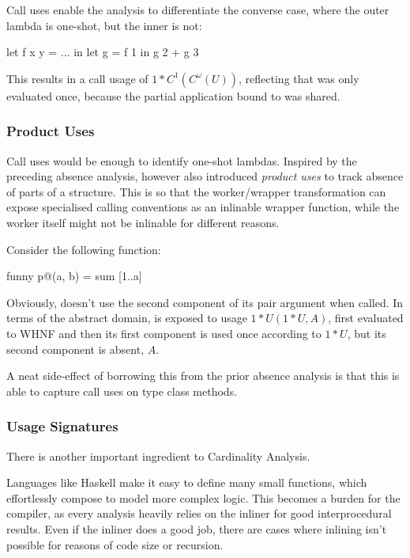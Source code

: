 Call uses enable the analysis to differentiate the converse case, where the outer lambda is one-shot, but the inner is not:
\begin{haskellcode}
  let f x y = ...
  in let g = f 1
     in g 2 + g 3
\end{haskellcode}

This results in a call usage of $1*C^1(C^\omega(U))$, reflecting that  was only evaluated once, because the partial application bound to  was shared.

\subsubsection{Product Uses}

Call uses would be enough to identify one-shot lambdas.
Inspired by the preceding absence analysis, \textcite{card} however also introduced \emph{product uses} to track absence of parts of a structure.
This is so that the worker/wrapper transformation can expose specialised calling conventions as an inlinable wrapper function, while the worker itself might not be inlinable for different reasons.

Consider the following  function:
\begin{haskellcode}
  funny p@(a, b) = sum [1..a]
\end{haskellcode}

Obviously,  doesn't use the second component of its pair argument when called.
In terms of the abstract domain,  is exposed to usage $1*U(1*U, A)$, \eg first evaluated to WHNF and then its first component is used once according to $1*U$, but its second component is absent, $A$.

A neat side-effect of borrowing this from the prior absence analysis is that this is able to capture call uses on type class methods.

\subsubsection{Usage Signatures}

There is another important ingredient to Cardinality Analysis.

Languages like Haskell make it easy to define many small functions, which effortlessly compose to model more complex logic.
This becomes a burden for the compiler, as every analysis heavily relies on the inliner for good interprocedural results.
Even if the inliner does a good job, there are cases where inlining isn't possible for reasons of code size or recursion.


